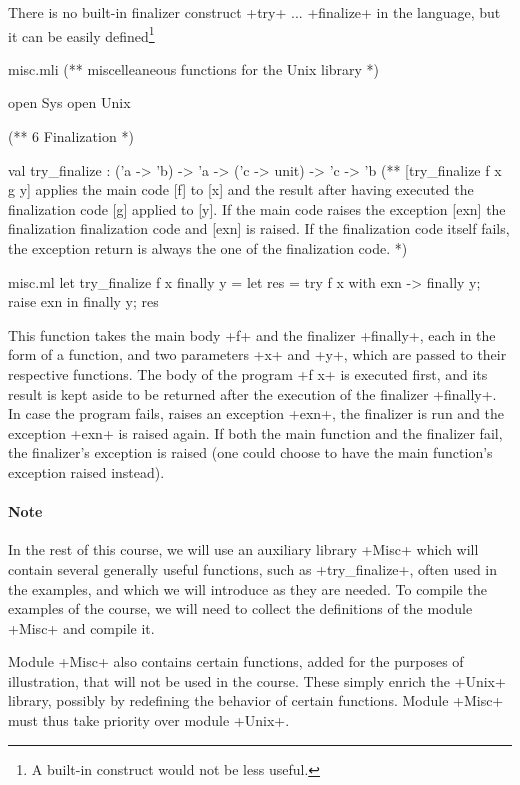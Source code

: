 There is no built-in finalizer construct \ml+try+ ... \ml+finalize+ in
the {\ocaml} language, but it can be easily defined\footnote{A
  built-in construct would not be less useful.}
\begin{codefile}{misc.mli}
(** miscelleaneous functions for the Unix library *)

open Sys
open Unix

(** {6 Finalization} *)

val try_finalize : ('a -> 'b) -> 'a -> ('c -> unit) -> 'c -> 'b
(** [try_finalize f x g y] applies the main code [f] to [x] and
    the result after having executed the finalization 
   code [g] applied to [y]. If the main code raises the exception
   [exn] the finalization finalization code and [exn] is raised.
   If the finalization code itself fails, the exception
   return is always the one of the finalization code. *)
\end{codefile}
%
\begin{listingcodefile}{misc.ml}
let try_finalize f x finally y =
  let res = try f x with exn -> finally y; raise exn in 
  finally y; 
  res
\end{listingcodefile}
%
This function takes the main body \ml+f+ and the finalizer
\ml+finally+, each in the form of a function, and two parameters \ml+x+
and \ml+y+, which are passed to their respective functions. The body
of the program \ml+f x+ is executed first, and its result is kept
aside to be returned after the execution of the finalizer 
\ml+finally+. In case the program fails, \ie{} raises an exception \ml+exn+,
the finalizer is run and the exception \ml+exn+ is raised
again. If both the main function and the finalizer fail, the
finalizer's exception is raised (one could choose to have the main
function's exception raised instead).

\paragraph{Note}

In the rest of this course, we will use an auxiliary library \ml+Misc+
which will contain several generally useful functions, such as
\ml+try_finalize+, often used in the examples, and which we will
introduce as they are needed. To compile the examples of the course, we will
need to collect the definitions of the module \ml+Misc+ and
compile it.

Module \ml+Misc+ also contains certain functions, added for the
purposes of illustration, that will not be used in the course. These
simply enrich the \ml+Unix+ library, possibly by redefining the
behavior of certain functions.  Module \ml+Misc+ must thus take
priority over module \ml+Unix+.

